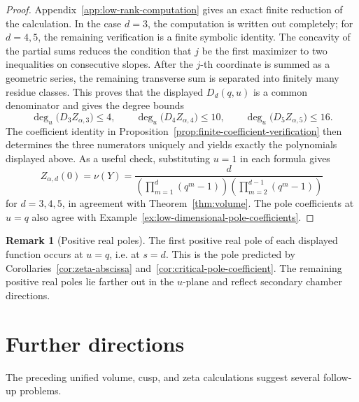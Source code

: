 \documentclass[11pt]{amsart}
\theoremstyle{plain}
\theoremstyle{definition}
\newtheorem{remark}[theorem]{Remark}
\numberwithin{equation}{section}
\begin{document}
\begin{proof}
Appendix~\ref{app:low-rank-computation} gives an exact finite reduction of the
calculation.  In the case \(d=3\), the computation is written out completely; for
\(d=4,5\), the remaining verification is a finite symbolic identity.  The concavity of
the partial sums reduces the condition that $j$ be the first
maximizer to two inequalities on consecutive slopes.  After the $j$-th coordinate is summed
as a geometric series, the remaining transverse sum is separated into finitely many residue
classes.  This proves that the displayed $D_d(q,u)$ is a common denominator and gives the
degree bounds
\[
  \deg_u\bigl(D_3Z_{\alpha,3}\bigr)\le4,\qquad
  \deg_u\bigl(D_4Z_{\alpha,4}\bigr)\le10,\qquad
  \deg_u\bigl(D_5Z_{\alpha,5}\bigr)\le16.
\]
The coefficient identity in Proposition~\ref{prop:finite-coefficient-verification} then
determines the three numerators uniquely and yields exactly the polynomials displayed above.
As a useful check, substituting $u=1$ in each formula gives
\[
  Z_{\alpha,d}(0)=\nu(Y)
  =
  \frac{d}{\left(\prod_{m=1}^{d}(q^m-1)\right)
            \left(\prod_{m=2}^{d-1}(q^m-1)\right)}
\]
for $d=3,4,5$, in agreement with Theorem~\ref{thm:volume}. The pole coefficients at
\(u=q\) also agree with Example~\ref{ex:low-dimensional-pole-coefficients}.
\end{proof}

\begin{remark}[Positive real poles]
The first positive real pole of each displayed function occurs at $u=q$, i.e. at $s=d$.
This is the pole predicted by Corollaries~\ref{cor:zeta-abscissa} and~\ref{cor:critical-pole-coefficient}.  The remaining
positive real poles lie farther out in the $u$-plane and reflect secondary chamber
directions.
\end{remark}

\section{Further directions}

The preceding unified volume, cusp, and zeta calculations suggest several
follow-up problems.
\end{document}
